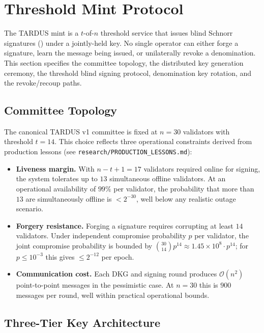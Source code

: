 \section{Threshold Mint Protocol}
\label{sec:mint}

The TARDUS mint is a $t$-of-$n$ threshold service that issues blind Schnorr signatures () under a jointly-held key. No single operator can either forge a signature, learn the message being issued, or unilaterally revoke a denomination. This section specifies the committee topology, the distributed key generation ceremony, the threshold blind signing protocol, denomination key rotation, and the revoke/recoup paths.

\subsection{Committee Topology}
\label{sec:mint-topology}

The canonical TARDUS v1 committee is fixed at $n = 30$ validators with threshold $t = 14$. This choice reflects three operational constraints derived from production lessons (see \texttt{research/PRODUCTION\_LESSONS.md}):

\begin{itemize}[leftmargin=2em,itemsep=0pt]
  \item \textbf{Liveness margin.} With $n - t + 1 = 17$ validators required online for signing, the system tolerates up to $13$ simultaneous offline validators. At an operational availability of $99\%$ per validator, the probability that more than $13$ are simultaneously offline is $< 2^{-30}$, well below any realistic outage scenario.
  \item \textbf{Forgery resistance.} Forging a signature requires corrupting at least $14$ validators. Under independent compromise probability $p$ per validator, the joint compromise probability is bounded by $\binom{30}{14} p^{14} \approx 1.45 \times 10^8 \cdot p^{14}$; for $p \leq 10^{-3}$ this gives $\leq 2^{-12}$ per epoch.
  \item \textbf{Communication cost.} Each DKG and signing round produces $\mathcal{O}(n^2)$ point-to-point messages in the pessimistic case. At $n = 30$ this is $900$ messages per round, well within practical operational bounds.
\end{itemize}

\subsection{Three-Tier Key Architecture}
\label{sec:mint-keyarch}

